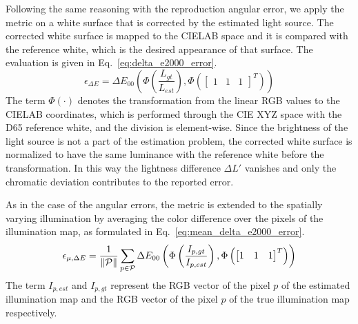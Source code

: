 Following the same reasoning with the reproduction angular error, we apply the metric on a white surface that is corrected by the estimated light source. The corrected white surface is mapped to the CIELAB space and it is compared with the reference white, which is the desired appearance of that surface. The evaluation is given in Eq.~\ref{eq:delta_e2000_error}.
\begin{equation}
    \epsilon_{\Delta E} = \Delta E_{00}\left(\Phi\left(\frac{L_{gt}}{L_{est}}\right), \Phi\left(\begin{bmatrix} 1 & 1 & 1 \end{bmatrix}^T\right)\right)
    \label{eq:delta_e2000_error}
\end{equation}
The term $\Phi(\cdot)$ denotes the transformation from the linear RGB values to the CIELAB coordinates, which is performed through the CIE XYZ space with the D65 reference white, and the division is element-wise. Since the brightness of the light source is not a part of the estimation problem, the corrected white surface is normalized to have the same luminance with the reference white before the transformation. In this way the lightness difference $\Delta L'$ vanishes and only the chromatic deviation contributes to the reported error.

As in the case of the angular errors, the metric is extended to the spatially varying illumination by averaging the color difference over the pixels of the illumination map, as formulated in Eq.~\ref{eq:mean_delta_e2000_error}.
\begin{equation}
    \epsilon_{\mu,\Delta E} = \frac{1}{\left\lVert\mathcal{P}\right\rVert}\sum_{p\in\mathcal{P}}{\Delta E_{00}\left(\Phi\left(\frac{I_{p,gt}}{I_{p,est}}\right), \Phi\left(\begin{bmatrix} 1 & 1 & 1 \end{bmatrix}^T\right)\right)}
    \label{eq:mean_delta_e2000_error}
\end{equation}
The term $I_{p,est}$ and $I_{p,gt}$ represent the RGB vector of the pixel $p$ of the estimated illumination map and the RGB vector of the pixel $p$ of the true illumination map respectively.